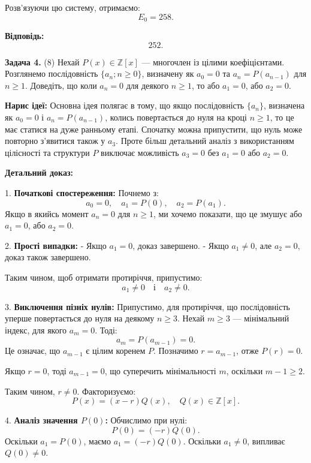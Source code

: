 \documentclass{article}
\begin{document}
Розв’язуючи цю систему, отримаємо:
\[
E_0 = 258.
\]

\textbf{Відповідь:}  
\[
\boxed{252}.
\]


\noindent\textbf{Задача 4.} (8) Нехай \( P(x) \in \mathbb{Z}[x] \) — многочлен із цілими коефіцієнтами. Розглянемо послідовність \( \{a_n; n \geq 0\} \), визначену як \( a_0 = 0 \) та \( a_n = P(a_{n-1}) \) для \( n \geq 1 \). Доведіть, що коли \( a_n = 0 \) для деякого \( n \geq 1 \), то або \( a_1 = 0 \), або \( a_2 = 0 \).

\textbf{Нарис ідеї:}
Основна ідея полягає в тому, що якщо послідовність \( \{a_n\} \), визначена як \( a_0=0 \) і \( a_n=P(a_{n-1}) \), колись повертається до нуля на кроці \( n \geq 1 \), то це має статися на дуже ранньому етапі. Спочатку можна припустити, що нуль може повторно з'явитися також у \( a_3 \). Проте більш детальний аналіз з використанням цілісності та структури \( P \) виключає можливість \( a_3 = 0 \) без \( a_1 = 0 \) або \( a_2 = 0 \).

\textbf{Детальний доказ:}

1. \textbf{Початкові спостереження:}
   Почнемо з:
   \[
   a_0 = 0, \quad a_1 = P(0), \quad a_2 = P(a_1).
   \]
   Якщо в якийсь момент \( a_n = 0 \) для \( n \geq 1 \), ми хочемо показати, що це змушує або \( a_1 = 0 \), або \( a_2 = 0 \).

2. \textbf{Прості випадки:}
   - Якщо \( a_1 = 0 \), доказ завершено.
   - Якщо \( a_1 \neq 0 \), але \( a_2 = 0 \), доказ також завершено.

   Таким чином, щоб отримати протиріччя, припустимо:
   \[
   a_1 \neq 0 \quad \text{і} \quad a_2 \neq 0.
   \]

3. \textbf{Виключення пізніх нулів:}
   Припустимо, для протиріччя, що послідовність уперше повертається до нуля на деякому \( n \geq 3 \). Нехай \( m \geq 3 \) — мінімальний індекс, для якого \( a_m = 0 \). Тоді:
   \[
   a_m = P(a_{m-1}) = 0.
   \]
   Це означає, що \( a_{m-1} \) є цілим коренем \( P \). Позначимо \( r = a_{m-1} \), отже \( P(r) = 0 \).

   Якщо \( r = 0 \), тоді \( a_{m-1} = 0 \), що суперечить мінімальності \( m \), оскільки \( m-1 \geq 2 \).

   Таким чином, \( r \neq 0 \). Факторизуємо:
   \[
   P(x) = (x-r)Q(x), \quad Q(x) \in \mathbb{Z}[x].
   \]

4. \textbf{Аналіз значення \( P(0) \):}
   Обчислимо при нулі:
   \[
   P(0) = (-r)Q(0).
   \]
   Оскільки \( a_1 = P(0) \), маємо \( a_1 = (-r)Q(0) \). Оскільки \( a_1 \neq 0 \), випливає \( Q(0) \neq 0 \).
\end{document}
